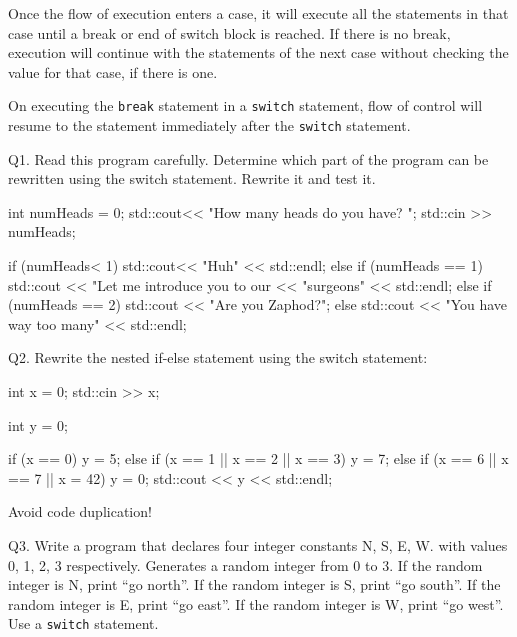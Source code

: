 Once the flow of execution enters a case, it will execute all the
statements in that case until a break or end of switch block is reached.
If there is no break, execution will continue with the statements of the
next case without checking the value for that case, if there is one.

On executing the \texttt{break} statement in a \texttt{switch} statement,
flow of control will resume to the statement immediately after the
\texttt{switch} statement.

\newpage{}

\begin{ex}
Q1. Read this program carefully. Determine which part of the program can
be rewritten using the switch statement. Rewrite it and test it.
\begin{console}
int numHeads = 0;
std::cout<< "How many heads do you have? ";
std::cin >> numHeads;

if (numHeads< 1)
{
    std::cout<< "Huh" << std::endl;
}
else
{
     if (numHeads == 1)
     {
         std::cout << "Let me introduce you to our << "surgeons"
                   << std::endl;
     }
     else
     {
          if (numHeads == 2)
          {
              std::cout << "Are you Zaphod?";
          }
          else
          {
              std::cout << "You have way too many"
                       << std::endl;
          }
     }
}
\end{console}
\end{ex}

\begin{ex}
Q2. Rewrite the nested if-else statement using the switch statement:
\begin{console}
int x = 0;
std::cin >> x;

int y = 0;

if (x == 0)
{
    y = 5;
}
else if (x == 1 || x == 2 || x == 3)
{
    y = 7;
}
else if (x == 6 || x == 7 || x = 42)
{
    y = 0;
}
std::cout << y << std::endl;
\end{console}
\end{ex}
Avoid code duplication!
\begin{ex}
Q3. Write a program that declares four integer constants N, S, E, W.
with values 0, 1, 2, 3 respectively. Generates a random integer from 0
to 3. If the random integer is N, print ``go north''. If the random
integer is S, print ``go south''. If the random integer is E, print ``go
east''. If the random integer is W, print ``go west''. Use a
\texttt{switch} statement.
\end{ex}
